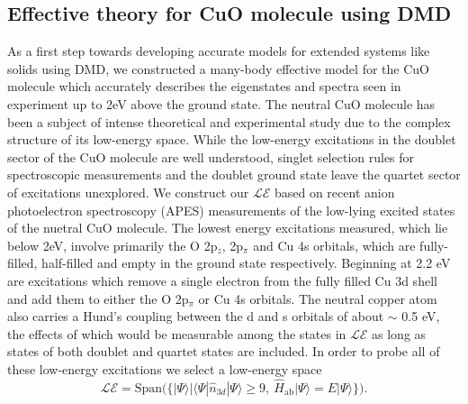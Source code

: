 \documentclass[12pt]{article}
\begin{document}
\subsection{Effective theory for CuO molecule using DMD}
As a first step towards developing accurate models for extended systems like solids using DMD, we constructed a many-body effective model for the CuO molecule which accurately describes the eigenstates and spectra seen in experiment up to 2eV above the ground state.
The neutral CuO molecule has been a subject of intense theoretical and experimental study due to the complex structure of its low-energy space.
While the low-energy excitations in the doublet sector of the CuO molecule are well understood, singlet selection rules for spectroscopic measurements and the doublet ground state leave the quartet sector of excitations unexplored.
We construct our $\mathcal{LE}$ based on recent anion photoelectron spectroscopy (APES) measurements of the low-lying excited states of the nuetral CuO molecule. 
The lowest energy excitations measured, which lie below 2eV, involve primarily the O 2p$_z$, 2p$_\pi$ and Cu 4s orbitals, which are fully-filled, half-filled and empty in the ground state respectively.
Beginning at 2.2 eV are excitations which remove a single electron from the fully filled Cu 3d shell and add them to either the O 2p$_\pi$ or Cu 4s orbitals.
The neutral copper atom also carries a Hund's coupling between the d and s orbitals of about $\sim$ 0.5 eV, the effects of which would be measurable among the states in $\mathcal{LE}$ as long as states of both doublet and quartet states are included.
In order to probe all of these low-energy excitations we select a low-energy space
\begin{equation}
\mathcal{LE} = \text{Span(}\{ |\Psi \rangle | \langle \Psi | \hat{n}_{3d} | \Psi \rangle \ge 9,\ \hat{H}_\text{ab}|\Psi\rangle = E |\Psi\rangle \}\text{)}.
\label{eq:LE}
\end{equation}
\end{document}
